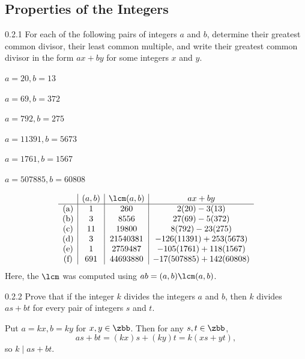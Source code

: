 \subsection{Properties of the Integers}

\begin{exercise}{0.2.1}
    For each of the following pairs of integers $a$ and $b$, determine their greatest common divisor, their least common multiple, and write their greatest common divisor in the form $ax + by$ for some integers $x$ and $y$.
    \begin{subexercises}
        \item $a = 20, b = 13$
        \item $a= 69, b = 372$
        \item $a = 792, b = 275$
        \item $a = 11391, b = 5673$
        \item $a= 1761, b = 1567$
        \item $a = 507885, b = 60808$
    \end{subexercises}
\end{exercise}

\begin{sol}
    \[
        \begin{array}{c|c|c|c}
            & (a, b) & \lcm(a, b) & ax + by \\
            \hline
            (\text a) & 1 & 260 & 2(20) - 3(13) \\
            (\text b) & 3 & 8556 & 27(69) - 5(372) \\
            (\text c) & 11 & 19800 & 8(792) - 23(275) \\
            (\text d) & 3 & 21540381 & -126(11391) + 253(5673) \\
            (\text e) & 1 & 2759487 & -105(1761) + 118(1567) \\
            (\text f) & 691 & 44693880 & -17(507885) + 142(60808)
        \end{array}
    \]
    Here, the $\lcm$ was computed using $ab = (a, b)\lcm(a, b)$.
\end{sol}

\begin{exercise}{0.2.2}
    Prove that if the integer $k$ divides the integers $a$ and $b$, then $k$ divides $as + bt$ for every pair of integers $s$ and $t$. 
\end{exercise}

\begin{sol}
    Put $a = kx, b = ky$ for $x, y \in \zbb$.
    Then for any $s, t \in \zbb$,
    \[
        as + bt = (kx)s + (ky)t = k(xs + yt),
    \]
    so $k \mid as + bt$.
\end{sol}

